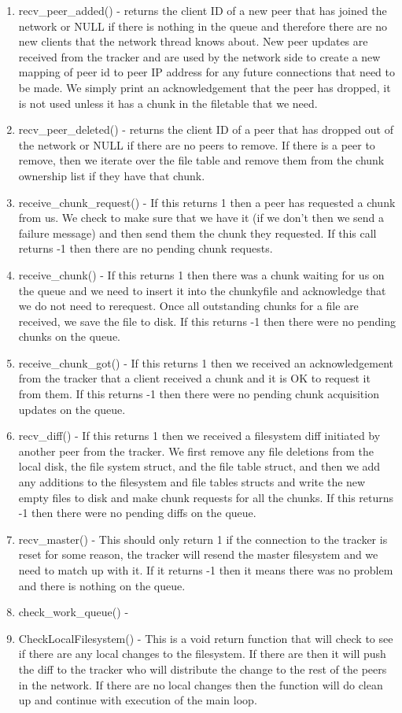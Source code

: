 	\begin{enumerate}
		\item recv_peer_added() - returns the client ID of a new peer that has joined the network or NULL if there is nothing in the queue and therefore there are no new clients that the network thread knows about.  New peer updates are received from the tracker and are used by the network side to create a new mapping of peer id to peer IP address for any future connections that need to be made.  We simply print an acknowledgement that the peer has dropped, it is not used unless it has a chunk in the filetable that we need.
		\item recv_peer_deleted() - returns the client ID of a peer that has dropped out of the network or NULL if there are no peers to remove.  If there is a peer to remove, then we iterate over the file table and remove them from the chunk ownership list if they have that chunk.
		\item receive_chunk_request() - If this returns 1 then a peer has requested a chunk from us.  We check to make sure that we have it (if we don't then we send a failure message) and then send them the chunk they requested.  If this call returns -1 then there are no pending chunk requests.
		\item receive_chunk() - If this returns 1 then there was a chunk waiting for us on the queue and we need to insert it into the chunkyfile and acknowledge that we do not need to rerequest.  Once all outstanding chunks for a file are received, we save the file to disk.  If this returns -1 then there were no pending chunks on the queue.  
		\item receive_chunk_got() - If this returns 1 then we received an acknowledgement from the tracker that a client received a chunk and it is OK to request it from them.  If this returns -1 then there were no pending chunk acquisition updates on the queue.
		\item recv_diff() - If this returns 1 then we received a filesystem diff initiated by another peer from the tracker.  We first remove any file deletions from the local disk, the file system struct, and the file table struct, and then we add any additions to the filesystem and file tables structs and write the new empty files to disk and make chunk requests for all the chunks.  If this returns -1 then there were no pending diffs on the queue.
		\item recv_master() - This should only return 1 if the connection to the tracker is reset for some reason, the tracker will resend the master filesystem and we need to match up with it. If it returns -1 then it means there was no problem and there is nothing on the queue.
		\item check_work_queue() - 
		\item CheckLocalFilesystem() - This is a void return function that will check to see if there are any local changes to the filesystem.  If there are then it will push the diff to the tracker who will distribute the change to the rest of the peers in the network.  If there are no local changes then the function will do clean up and continue with execution of the main loop.
	\end{enumerate}

